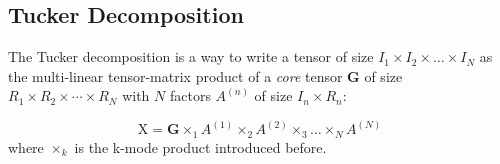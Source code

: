 \newpage
\subsection{Tucker Decomposition}
The Tucker decomposition is a way to write a tensor of size $I_1 \times I_2 \times \ldots \times I_N$ as the multi-linear tensor-matrix product of a \emph{core} tensor $\mathbf{G}$ of size $R_1 \times R_2 \times \cdots \times R_N$ with $N$ factors $A^{(n)}$ of size $I_n \times R_n$:

\begin{equation}
\label{eq:tucker-general}
    \mathrm{X} = \mathbf{G} \times_{1} A^{(1)} \times_{2} A^{(2)} \times_{3} \ldots \times_{N} A^{(N)}
\end{equation}
where $\times_k$ is the k-mode product introduced before. 
\newline 
 
